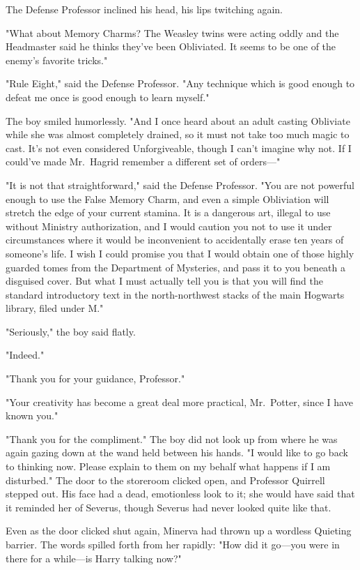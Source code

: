 The Defense Professor inclined his head, his lips twitching again.

"What about Memory Charms? The Weasley twins were acting oddly and the Headmaster said he thinks they've been Obliviated. It seems to be one of the enemy's favorite tricks."

"Rule Eight," said the Defense Professor. "Any technique which is good enough to defeat me once is good enough to learn myself."

The boy smiled humorlessly. "And I once heard about an adult casting Obliviate while she was almost completely drained, so it must not take too much magic to cast. It's not even considered Unforgiveable, though I can't imagine why not. If I could've made Mr.~Hagrid remember a different set of orders---"

"It is not that straightforward," said the Defense Professor. "You are not powerful enough to use the False Memory Charm, and even a simple Obliviation will stretch the edge of your current stamina. It is a dangerous art, illegal to use without Ministry authorization, and I would caution you not to use it under circumstances where it would be inconvenient to accidentally erase ten years of someone's life. I wish I could promise you that I would obtain one of those highly guarded tomes from the Department of Mysteries, and pass it to you beneath a disguised cover. But what I must actually tell you is that you will find the standard introductory text in the north-northwest stacks of the main Hogwarts library, filed under M."

"Seriously," the boy said flatly.

"Indeed."

"Thank you for your guidance, Professor."

"Your creativity has become a great deal more practical, Mr.~Potter, since I have known you."

"Thank you for the compliment." The boy did not look up from where he was again gazing down at the wand held between his hands. "I would like to go back to thinking now. Please explain to them on my behalf what happens if I am disturbed."
\sbreak
The door to the storeroom clicked open, and Professor Quirrell stepped out. His face had a dead, emotionless look to it; she would have said that it reminded her of Severus, though Severus had never looked quite like that.

Even as the door clicked shut again, Minerva had thrown up a wordless Quieting barrier. The words spilled forth from her rapidly: "How did it go---you were in there for a while---is Harry talking now?"

